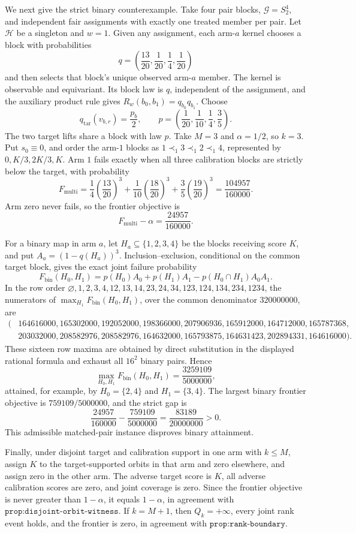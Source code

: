 We next give the strict binary counterexample. Take four pair blocks, \(\mathcal G=S_2^4\), and independent fair assignments with exactly one treated member per pair. Let \(\mathcal H\) be a singleton and \(w=1\). Given any assignment, each arm-\(a\) kernel chooses a block with probabilities \[q=\left(\frac{13}{20},\frac1{20},\frac14,\frac1{20}\right)\] and then selects that block's unique observed arm-\(a\) member. The kernel is observable and equivariant. Its block law is \(q\), independent of the assignment, and the auxiliary product rule gives \(R_w(b_0,b_1)=q_{b_0}q_{b_1}\). Choose \[q_{\mathrm{tar}}(v_{b,r})=\frac{p_b}{2},\qquad p=\left(\frac1{20},\frac1{10},\frac14,\frac35\right).\] The two target lifts share a block with law \(p\). Take \(M=3\) and \(\alpha=1/2\), so \(k=3\). Put \(s_0\equiv0\), and order the arm-\(1\) blocks as \(1\prec_1 3\prec_1 2\prec_1 4\), represented by \(0,K/3,2K/3,K\). Arm \(1\) fails exactly when all three calibration blocks are strictly below the target, with probability \[F_{\mathrm{multi}}=\frac14\left(\frac{13}{20}\right)^3+\frac1{10}\left(\frac{18}{20}\right)^3+\frac35\left(\frac{19}{20}\right)^3=\frac{104957}{160000}.\] Arm zero never fails, so the frontier objective is \[F_{\mathrm{multi}}-\alpha=\frac{24957}{160000}.\]

For a binary map in arm \(a\), let \(H_a\subseteq\{1,2,3,4\}\) be the blocks receiving score \(K\), and put \(A_a=(1-q(H_a))^3\). Inclusion--exclusion, conditional on the common target block, gives the exact joint failure probability \[F_{\mathrm{bin}}(H_0,H_1)=p(H_0)A_0+p(H_1)A_1-p(H_0\cap H_1)A_0A_1.\] In the row order \(\varnothing,1,2,3,4,12,13,14,23,24,34,123,124,134,234,1234\), the numerators of \(\max_{H_1}F_{\mathrm{bin}}(H_0,H_1)\), over the common denominator \(320000000\), are \[\begin{split}(&164616000,165302000,192052000,198366000,207906936,165912000,164712000,165787368,\\&203032000,208582976,208582976,164632000,165793875,164631423,202894331,164616000).\end{split}\] These sixteen row maxima are obtained by direct substitution in the displayed rational formula and exhaust all \(16^2\) binary pairs. Hence \[\max_{H_0,H_1}F_{\mathrm{bin}}(H_0,H_1)=\frac{3259109}{5000000},\] attained, for example, by \(H_0=\{2,4\}\) and \(H_1=\{3,4\}\). The largest binary frontier objective is \(759109/5000000\), and the strict gap is \[\frac{24957}{160000}-\frac{759109}{5000000}=\frac{83189}{20000000}>0.\] This admissible matched-pair instance disproves binary attainment.

Finally, under disjoint target and calibration support in one arm with \(k\le M\), assign \(K\) to the target-supported orbits in that arm and zero elsewhere, and assign zero in the other arm. The adverse target score is \(K\), all adverse calibration scores are zero, and joint coverage is zero. Since the frontier objective is never greater than \(1-\alpha\), it equals \(1-\alpha\), in agreement with \(\texttt{prop:disjoint-orbit-witness}\). If \(k=M+1\), then \(Q_k=+\infty\), every joint rank event holds, and the frontier is zero, in agreement with \(\texttt{prop:rank-boundary}\).